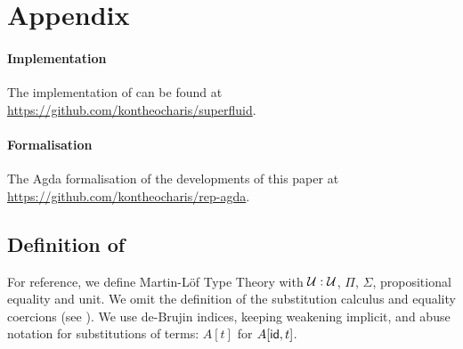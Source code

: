 \clearpage
\section{Appendix}

\allowdisplaybreaks

\paragraph{Implementation}

The implementation of \superfluid can be found at \url{https://github.com/kontheocharis/superfluid}.

\paragraph{Formalisation}

The Agda formalisation of the developments of this paper at \url{https://github.com/kontheocharis/rep-agda}.

\subsection{Definition of \lambdamltt}

For reference, we define Martin-Löf Type Theory with $\mathcal{U} :
\mathcal{U}$, $\Pi$, $\Sigma$, propositional equality and unit. We omit the
definition of the substitution calculus and equality coercions
(see \cite[5.1.2]{Castellan2019-qo}). We use de-Brujin indices, keeping weakening
implicit, and abuse notation for substitutions of terms: $A[t]$ for $A[\textsf{id},
t]$.

\newcommand{\refl}{\mta{refl}}
\newcommand{\fst}{\mta{fst}}
\newcommand{\snd}{\mta{snd}}
\newcommand{\pair}{\mta{pair}}
\newcommand{\app}{\mta{app}}
\newcommand{\lam}{\mta{lam}}
\newcommand{\J}{\mta{J}}


